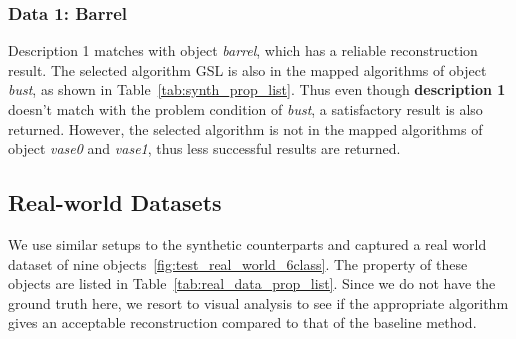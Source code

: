 \subsubsection{Data 1: Barrel}
Description 1 matches with object \textit{barrel}, which has a reliable reconstruction result. The selected algorithm GSL is also in the mapped algorithms of object \textit{bust}, as shown in Table~\ref{tab:synth_prop_list}. Thus even though \textbf{description 1} doesn't match with the problem condition of \textit{bust}, a satisfactory result is also returned. However, the selected algorithm is not in the mapped algorithms of object \textit{vase0} and \textit{vase1}, thus less successful results are returned.

\subsection{Real-world Datasets}
We use similar setups to the synthetic counterparts and captured a real world dataset of nine objects~\ref{fig:test_real_world_6class}. The property of these objects are listed in Table~\ref{tab:real_data_prop_list}. Since we do not have the ground truth here, we resort to visual analysis to see if the appropriate algorithm gives an acceptable reconstruction compared to that of the baseline method.
